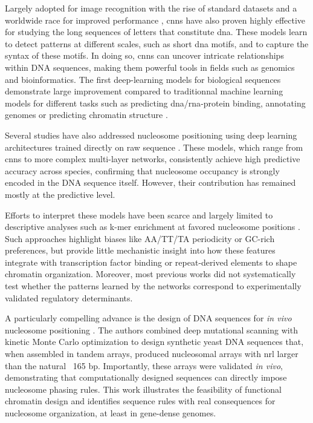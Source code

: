 \documentclass[11pt]{book}
\begin{document}
Largely adopted for image recognition with the rise of standard datasets and a worldwide race for improved performance \cite{li_mnist_2012, krizhevsky_imagenet_2017}, \glspl{cnn} have also proven highly effective for studying the long sequences of letters that constitute \gls{dna}. These models learn to detect patterns at different scales, such as short \gls{dna} motifs, and to capture the syntax of these motifs. In doing so, \glspl{cnn} can uncover intricate relationships within DNA sequences, making them powerful tools in fields such as genomics and bioinformatics. The first deep-learning models for biological sequences demonstrate large improvement compared to traditionnal machine learning models for different tasks such as predicting \gls{dna}/\gls{rna}-protein binding\cite{alipanahi_predicting_2015}, annotating genomes \cite{zhou_predicting_2015, kelley_basset_2016} or predicting chromatin structure \cite{wang_review_2025}.

Several studies have also addressed nucleosome positioning using deep learning architectures trained directly on raw sequence \cite{di_gangi_deep_2018, amato_corenup_2020, zhou_deepnup_2022, han_nucleosome_2022}. These models, which range from \glspl{cnn} to more complex multi-layer networks, consistently achieve high predictive accuracy across species, confirming that nucleosome occupancy is strongly encoded in the DNA sequence itself. However, their contribution has remained mostly at the predictive level.

Efforts to interpret these models have been scarce and largely limited to descriptive analyses such as k-mer enrichment at favored nucleosome positions \cite{masoudi-sobhanzadeh_interpretable_2024, mondo_consecutive_2025}. Such approaches highlight biases like AA/TT/TA periodicity or GC-rich preferences, but provide little mechanistic insight into how these features integrate with transcription factor binding or repeat-derived elements to shape chromatin organization. Moreover, most previous works did not systematically test whether the patterns learned by the networks correspond to experimentally validated regulatory determinants.

A particularly compelling advance is the design of DNA sequences for \textit{in vivo} nucleosome positioning \cite{routhier_silico_2024}. The authors combined deep mutational scanning with kinetic Monte Carlo optimization to design synthetic yeast DNA sequences that, when assembled in tandem arrays, produced nucleosomal arrays with \gls{nrl} larger than the natural ~165 bp. Importantly, these arrays were validated \textit{in vivo}, demonstrating that computationally designed sequences can directly impose nucleosome phasing rules. This work illustrates the feasibility of functional chromatin design and identifies sequence rules with real consequences for nucleosome organization, at least in gene-dense genomes.
\end{document}
